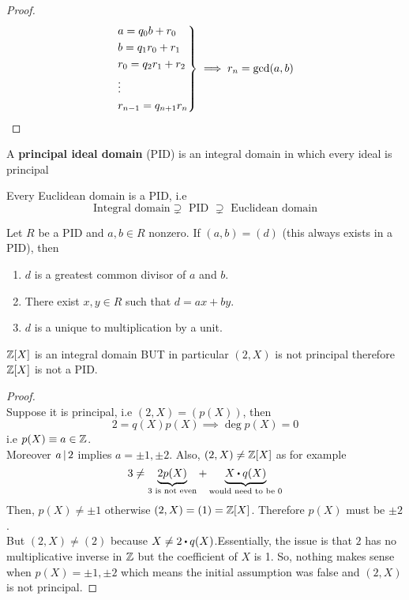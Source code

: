 \documentclass[../Main.tex]{subfiles}
\begin{document}
\begin{proof}\[
	\begin{rcases*}
	a=q_0b+r_0\\
	b=q_1r_0+r_1\\
	r_0=q_2r_1+r_2\\
	\vdots\\
	r_{n-1}=q_{n+1}r_n
	\end{rcases*} \implies r_n = \gcd(a,b)\]
\end{proof}
\begin{dfn}[title = Principal Ideal Domain]
	A \textbf{principal ideal domain} (PID) is an integral domain in which every ideal is principal
\end{dfn}
\begin{thm}[title = Euclidean domain is PID is Integral domain]
	Every Euclidean domain is a PID, i.e
	\[\text{Integral domain} \supsetneq \text{ PID } \supsetneq \text{ Euclidean domain}\]
\end{thm}
\begin{thm}
	Let $R$ be a PID and $a,b\in R$ nonzero.
	If $(a,b)=(d)$ (this always exists in a PID), then
	\begin{enumerate}[label=(\arabic*)]
		\item $d$ is a greatest common divisor of $a$ and $b$.
		\item There exist $x,y\in R$ such that $d=ax+by$.
		\item $d$ is a unique to multiplication by a unit.
	\end{enumerate}
\end{thm}
\begin{claim}
	$\mathbb{Z}[X]$ is an integral domain BUT in particular $(2,X)$ is not principal therefore $\mathbb{Z}[X]$ is not a PID.
\end{claim}
\begin{proof}~\\
	Suppose it is principal, i.e $(2,X)=(p(X))$, then 
	\[2=q(X)p(X) \implies \deg p(X)=0\]
	i.e $p(X)\equiv a\in \mathbb{Z}$.\\
	Moreover $a \, | \, 2$ implies $a=\pm1,\pm2$. Also, $(2,X)\ne \mathbb{Z}[X]$ as for example
	\[3\ne \underbrace{2p(X)}_{3 \text{ is not even}}+\underbrace{X\rdot q(X)}_{\text{would need to be } 0}\]
	Then, $p(X)\ne \pm 1$ otherwise $(2,X)=(1)=\mathbb{Z}[X]$. Therefore $p(X)$ must be $\pm 2$.\\
	But $(2,X) \ne (2)$ because $X \ne 2\rdot q(X)$.Essentially, the issue is that $2$ has no multiplicative inverse in $\mathbb{Z}$ but the coefficient of $X$ is 1. So, nothing makes sense when $p(X)=\pm1,\pm2$ which means the initial assumption was false and $(2,X)$ is not principal.
\end{proof}
\end{document}

